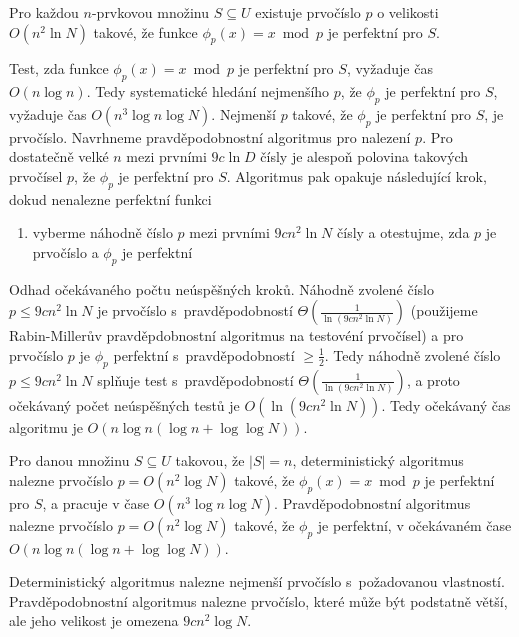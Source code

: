 \documentclass[a4paper,12pt]{article}
\begin{document}
\begin{veta}Pro každou $n$-prvkovou množinu $S\subseteq 
U$ 
existuje prvo\-čís\-lo $p$ o velikosti $O(n^2\ln N)$ takové, že 
funkce $\phi_p(x)=x\bmod p$ je perfektní pro $S$.  
\end{veta}

Test, zda funkce $\phi_p(x)=x\bmod p$ je perfektní 
pro $S$, 
vyžaduje čas $O(n\log n)$. Tedy systematické hledání 
nejmenšího $p$, že $\phi_p$ je perfektní pro $S$, vyžaduje čas 
$O(n^3\log n\log N)$. Nejmenší $p$ takové, že $\phi_p$ je perfektní 
pro $S$, 
je prvočíslo. Navrhneme pravděpodob\-nostní algoritmus 
pro nalezení $p$. Pro dostatečně velké $n$ mezi 
prvními $9c\ln D$ čísly je alespoň polovina tako\-vých 
prvočísel $p$, že $\phi_p$ je perfektní pro $S$. Algoritmus pak 
opakuje následující krok, dokud nenalezne perfektní funkci
\begin{enumerate}
\item 
vyberme náhodně číslo $p$ mezi prvními $9cn^2\ln 
N$ 
čísly a otestujme, zda $p$ je prvočíslo a $\phi_p$ je perfektní
\end{enumerate}

Odhad očekávaného počtu neúspěšných kroků.\newline 
Náhodně zvolené číslo $p\le 9cn^2\ln N$ je prvočíslo s~pravděpo\-dob\-ností $\Theta (\frac 1{\ln(9cn^2\ln N)})$ 
(použi\-je\-me Rabin-Millerův pravděpdobnostní algoritmus na testovéní prvočísel) a pro prvočíslo $
p$ je $\phi_p$ 
perfektní s~prav\-dě\-po\-dob\-ností $\ge\frac 12$. Tedy náhodně zvolené 
číslo $p\le 9cn^2\ln N$ splňuje test s~pravdě\-po\-dob\-ností 
$\Theta (\frac 1{\ln(9cn^2\ln N)})$, a proto očeká\-va\-ný počet neúspěšných 
testů je $O(\ln(9cn^2\ln N))$. Tedy očeká\-vaný čas 
algoritmu je $O(n\log n(\log n+\log\log N))$.

\begin{veta}Pro danou množinu $S\subseteq U$ takovou, že 
$|S|=n$, deterministický algoritmus nalezne prvočíslo 
$p=O(n^2\log N)$ takové, že $\phi_p(x)=x\bmod p$ je perfektní 
pro $S$, a pracuje v čase $O(n^3\log n\log N)$. Pravděpodobnostní 
algoritmus nalezne pr\-vočíslo $p=O(n^2\log N)$ takové, že 
$\phi_p$ je perfektní, v očekáva\-ném čase 
$O(n\log n(\log n+\log\log N))$.
\end{veta}

Deterministický algoritmus nalezne nejmenší prvočíslo s~po\-ža\-dovanou vlastností.  Prav\-dě\-podobnostní algoritmus 
nalezne prvočíslo, které může být podstatně 
větší, ale jeho velikost je omezena $9cn^2\log N$. 
\end{document}
